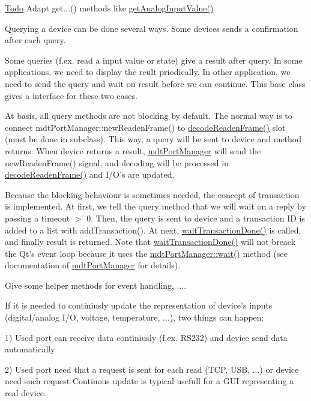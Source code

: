 \begin{Desc}
\item[\hyperlink{todo__todo000003}{Todo}]Adapt get...() methods like \hyperlink{classmdt_device_ab828764660ba53ffce1995901ddf5a0a}{getAnalogInputValue()} \end{Desc}


Querying a device can be done several ways. Some devices sends a confirmation after each query.

Some queries (f.ex. read a input value or state) give a result after query. In some applications, we need to display the reult priodically. In other application, we need to send the query and wait on result before we can continue. This base class gives a interface for these two cases.

At basis, all query methods are not blocking by default. The normal way is to connect mdtPortManager::newReadenFrame() to \hyperlink{classmdt_device_ad211ba3be781c3db0397d5bf91f796d1}{decodeReadenFrame()} slot (must be done in subclass). This way, a query will be sent to device and method returns. When device returns a result, \hyperlink{classmdt_port_manager}{mdtPortManager} will send the newReadenFrame() signal, and decoding will be processed in \hyperlink{classmdt_device_ad211ba3be781c3db0397d5bf91f796d1}{decodeReadenFrame()} and I/O's are updated.

Because the blocking behaviour is sometimes needed, the concept of transaction is implemented. At first, we tell the query method that we will wait on a reply by passing a timeout $>$ 0. Then, the query is sent to device and a transaction ID is added to a list with addTransaction(). At next, \hyperlink{classmdt_device_ab67f2da4f294482dd39ce6294ada8bc4}{waitTransactionDone()} is called, and finally result is returned. Note that \hyperlink{classmdt_device_ab67f2da4f294482dd39ce6294ada8bc4}{waitTransactionDone()} will not breack the Qt's event loop because it uses the \hyperlink{classmdt_port_manager_acc5c63ad33fdd3cc153fc23e00c6e69c}{mdtPortManager::wait()} method (see documentation of \hyperlink{classmdt_port_manager}{mdtPortManager} for details).

Give some helper methods for event handling, ....

If it is needed to continiusly update the representation of device's inputs (digital/analog I/O, voltage, temperature, ...), two things can happen:
\begin{DoxyItemize}
\item 1) Used port can receive data continiusly (f.ex. RS232) and device send data automatically
\item 2) Used port need that a request is sent for each read (TCP, USB, ...) or device need such request Continous update is typical usefull for a GUI representing a real device.
\end{DoxyItemize}

